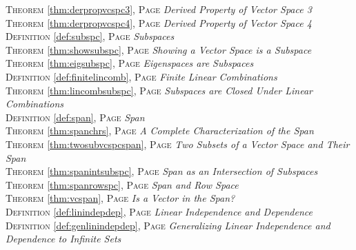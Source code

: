 \begin{multicols}{2}
{         \textsc{Theorem} \ref{thm:derpropvcspc3}, \textsc{Page} \pageref{thm:derpropvcspc3} \textit{Derived Property of Vector Space 3} \\
         \textsc{Theorem} \ref{thm:derpropvcspc4}, \textsc{Page} \pageref{thm:derpropvcspc4} \textit{Derived Property of Vector Space 4} \\
         \textsc{Definition} \ref{def:subspc}, \textsc{Page} \pageref{def:subspc} \textit{Subspaces} \\
         \textsc{Theorem} \ref{thm:showsubspc}, \textsc{Page} \pageref{thm:showsubspc} \textit{Showing a Vector Space is a Subspace} \\
         \textsc{Theorem} \ref{thm:eigsubspc}, \textsc{Page} \pageref{thm:eigsubspc} \textit{Eigenspaces are Subspaces} \\
         \textsc{Definition} \ref{def:finitelincomb}, \textsc{Page} \pageref{def:finitelincomb} \textit{Finite Linear Combinations} \\
         \textsc{Theorem} \ref{thm:lincombsubspc}, \textsc{Page} \pageref{thm:lincombsubspc} \textit{Subspaces are Closed Under Linear Combinations} \\
         \textsc{Definition} \ref{def:span}, \textsc{Page} \pageref{def:span} \textit{Span} \\
         \textsc{Theorem} \ref{thm:spanchrs}, \textsc{Page} \pageref{thm:spanchrs} \textit{A Complete Characterization of the Span} \\
         \textsc{Theorem} \ref{thm:twosubvcspcspan}, \textsc{Page} \pageref{thm:twosubvcspcspan} \textit{Two Subsets of a Vector Space and Their Span} \\
         \textsc{Theorem} \ref{thm:spanintsubspc}, \textsc{Page} \pageref{thm:spanintsubspc} \textit{Span as an Intersection of Subspaces} \\
         \textsc{Theorem} \ref{thm:spanrowspc}, \textsc{Page} \pageref{thm:spanrowspc} \textit{Span and Row Space} \\
         \textsc{Theorem} \ref{thm:vcspan}, \textsc{Page} \pageref{thm:vcspan} \textit{Is a Vector in the Span?} \\
         \textsc{Definition} \ref{def:linindepdep}, \textsc{Page} \pageref{def:linindepdep} \textit{Linear Independence and Dependence} \\
         \textsc{Definition} \ref{def:genlinindepdep}, \textsc{Page} \pageref{def:genlinindepdep} \textit{Generalizing Linear Independence and Dependence to Infinite Sets} \\
}
\end{multicols}
